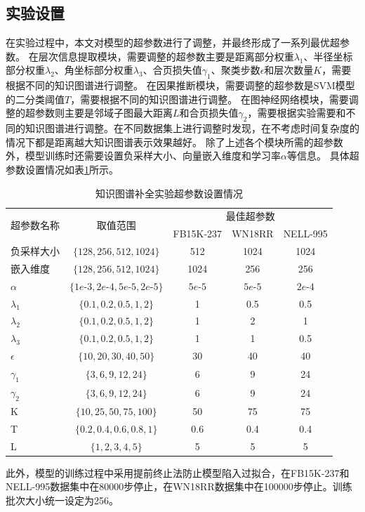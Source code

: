 \documentclass[algorithmlist, AutoFakeBold, AutoFakeSlant, figurelist, tablelist, nomlist, engineering]{seuthesix}
\begin{document}
\subsection{实验设置}
在实验过程中，本文对模型的超参数进行了调整，并最终形成了一系列最优超参数。
在层次信息提取模块，需要调整的超参数主要是距离部分权重$\lambda_1$、半径坐标部分权重$\lambda_2$、角坐标部分权重$\lambda_3$、合页损失值$\gamma_1$、聚类步数$\epsilon$和层次数量$K$，需要根据不同的知识图谱进行调整。
在因果推断模块，需要调整的超参数是SVM模型的二分类阈值$T$，需要根据不同的知识图谱进行调整。
在图神经网络模块，需要调整的超参数则主要是邻域子图最大距离$L$和合页损失值$\gamma_2$，需要根据实验需要和不同的知识图谱进行调整。在不同数据集上进行调整时发现，在不考虑时间复杂度的情况下都是距离越大知识图谱表示效果越好。
除了上述各个模块所需的超参数外，模型训练时还需要设置负采样大小、向量嵌入维度和学习率$\alpha$等信息。
具体超参数设置情况如表\ref{Hyperparameters1}所示。
\begin{table}[]
  \centering
  \begin{tabular*}{0.95\textwidth}{@{\extracolsep{\fill}}lcccc}
  \toprule[1pt]
  \multirow{2}{*}{超参数名称} & \multirow{2}{*}{取值范围} & \multicolumn{3}{c}{最佳超参数}\\ 
    & & FB15K-237 & WN18RR & NELL-995 \\ \hline
  负采样大小 & $\{128, 256, 512, 1024\}$ & 512 & 1024 & 1024 \\
  嵌入维度 & $\{128, 256, 512, 1024\}$ & 1024 & 256 & 256 \\
  $\alpha$ & $\{1e\text{-}3, 2e\text{-}4, 5e\text{-}5, 2e\text{-}5\}$ & $5e\text{-}5$ & $5e\text{-}5$ & $2e\text{-}4$ \\
  $\lambda_1$ & $\{0.1, 0.2, 0.5, 1, 2\}$ & 1 & 0.5 & 0.5 \\
  $\lambda_2$ & $\{0.1, 0.2, 0.5, 1, 2\}$ & 1 & 2 & 1 \\
  $\lambda_3$ & $\{0.1, 0.2, 0.5, 1, 2\}$ & 1 & 1 & 0.5 \\
  $\epsilon$ & $\{10, 20, 30, 40, 50\}$ & 30 & 40 & 40 \\
  $\gamma_1$ & $\{3, 6, 9, 12, 24\}$ & 6 & 9 & 24 \\
  $\gamma_2$ & $\{3, 6, 9, 12, 24\}$ & 6 & 9 & 24 \\
  K & $\{10, 25, 50, 75, 100\}$ & 50 & 75 & 75 \\
  T & $\{0.2, 0.4, 0.6, 0.8, 1\}$ & 0.6 & 0.4 & 0.4 \\
  L & $\{1, 2, 3, 4, 5\}$ & 5 & 5 & 5 \\
  \bottomrule[1pt]
  \end{tabular*}
  \caption{知识图谱补全实验超参数设置情况}
  \label{Hyperparameters1}
\end{table}
此外，模型的训练过程中采用提前终止法防止模型陷入过拟合，在FB15K-237和NELL-995数据集中在80000步停止，在WN18RR数据集中在100000步停止。训练批次大小统一设定为256。
\end{document}
